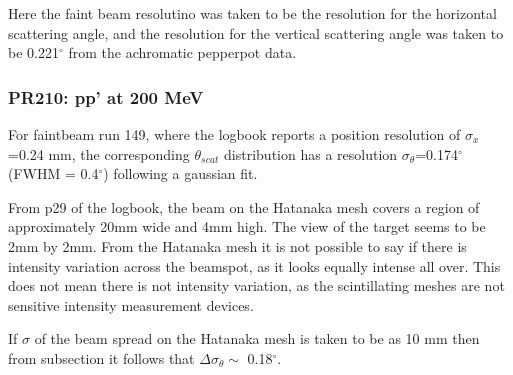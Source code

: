 \documentclass[11pt]{report}
\begin{document}
Here the faint beam resolutino was taken to be the resolution for the horizontal scattering angle, and
the resolution for the vertical scattering angle was taken to be 0.221$^{\circ}$ from the achromatic pepperpot
data.


\subsubsection{PR210: pp' at 200 MeV}

For faintbeam run 149, where the logbook reports a position resolution of $\sigma_x$=0.24 mm,
the corresponding $\theta_{scat}$ distribution has a resolution $\sigma_{\theta}$=0.174$^{\circ}$ (FWHM = 0.4$^{\circ}$)
following a gaussian fit.

From p29 of the logbook, the beam on the Hatanaka mesh covers a region of approximately 20mm wide and 4mm high.
The view of the target seems to be 2mm by 2mm.
From the Hatanaka mesh it is not possible to say if there is intensity variation across the beamspot, as it looks
equally intense all over. This does not mean there is not intensity variation, as the scintillating meshes are not
sensitive intensity measurement devices.

If $\sigma$ of the beam spread on the Hatanaka mesh is taken to be as 10 mm then from subsection \label{sec:incidentbeamangle}
it follows that $\Delta\sigma_{\theta} \sim$  0.18$^{\circ}$.  






\end{document}
